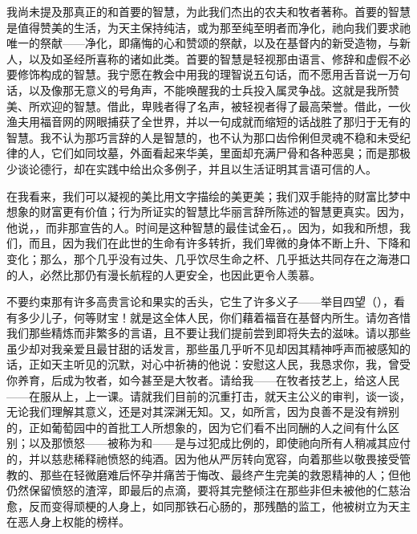 我尚未提及那真正的和首要的智慧，为此我们杰出的农夫和牧者著称。首要的智慧是值得赞美的生活，为天主保持纯洁，或为那至纯至明者而净化，祂向我们要求祂唯一的祭献——净化，即痛悔的心和赞颂的祭献，以及在基督内的新受造物，与新人，以及如圣经所喜称的诸如此类。首要的智慧是轻视那由语言、修辞和虚假不必要修饰构成的智慧。我宁愿在教会中用我的理智说五句话，而不愿用舌音说一万句话，以及像那无意义的号角声，不能唤醒我的士兵投入属灵争战。这就是我所赞美、所欢迎的智慧。借此，卑贱者得了名声，被轻视者得了最高荣誉。借此，一伙渔夫用福音网的网眼捕获了全世界，并以一句成就而缩短的话战胜了那归于无有的智慧。我不认为那巧言辞的人是智慧的，也不认为那口齿伶俐但灵魂不稳和未受纪律的人，它们如同坟墓，外面看起来华美，里面却充满尸骨和各种恶臭；而是那极少谈论德行，却在实践中给出众多例子，并且以生活证明其言语可信的人。\par

在我看来，我们可以凝视的美比用文字描绘的美更美；我们双手能持的财富比梦中想象的财富更有价值；行为所证实的智慧比华丽言辞所陈述的智慧更真实。因为，他说，，而非那宣告的人。时间是这种智慧的最佳试金石，。因为，如我和所想，我们，而且，因为我们在此世的生命有许多转折，我们卑微的身体不断上升、下降和变化；那么，那个几乎没有过失、几乎饮尽生命之杯、几乎抵达共同存在之海港口的人，必然比那仍有漫长航程的人更安全，也因此更令人羡慕。\par

不要约束那有许多高贵言论和果实的舌头，它生了许多义子——举目四望（），看有多少儿子，何等财宝！就是这全体人民，你们藉着福音在基督内所生。请勿吝惜我们那些精炼而非繁多的言语，且不要让我们提前尝到即将失去的滋味。请以那些虽少却对我亲爱且最甘甜的话发言，那些虽几乎听不见却因其精神呼声而被感知的话，正如天主听见的沉默，对心中祈祷的他说：安慰这人民，我恳求你，我，曾受你养育，后成为牧者，如今甚至是大牧者。请给我——在牧者技艺上，给这人民——在服从上，上一课。请就我们目前的沉重打击，就天主公义的审判，谈一谈，无论我们理解其意义，还是对其深渊无知。又，如所言，因为良善不是没有辨别的，正如葡萄园中的首批工人所想象的，因为它们看不出同酬的人之间有什么区别；以及那愤怒——被称为和——是与过犯成比例的，即使祂向所有人稍减其应付的，并以慈悲稀释祂愤怒的纯酒。因为他从严厉转向宽容，向着那些以敬畏接受管教的、那些在轻微磨难后怀孕并痛苦于悔改、最终产生完美的救恩精神的人；但他仍然保留愤怒的渣滓，即最后的点滴，要将其完整倾注在那些非但未被他的仁慈治愈，反而变得顽梗的人身上，如同那铁石心肠的，那残酷的监工，他被树立为天主在恶人身上权能的榜样。\par

